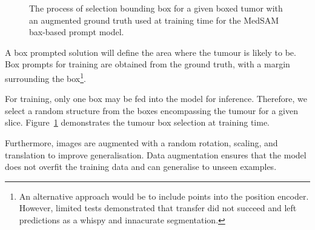 \documentclass[11pt,twoside]{report}
\begin{document}
\begin{figure}
  \centering
  \caption{The process of selection bounding box for a given boxed tumor with an augmented ground truth used at training time for the MedSAM bax-based prompt model.}\label{fig:box-prompt-sam-selection}
\end{figure}

A box prompted solution will define the area where the tumour is likely to be. Box prompts for training are obtained from the ground truth, with a margin surrounding the box\footnote{An alternative approach would be to include points into the position encoder. However, limited tests demonstrated that transfer did not succeed and left predictions as a whispy and innacurate segmentation.}.

For training, only one box may be fed into the model for inference. Therefore, we select a random structure from the boxes encompassing the tumour for a given slice. Figure~\ref{fig:box-prompt-sam-selection} demonstrates the tumour box selection at training time. 

Furthermore, images are augmented with a random rotation, scaling, and translation to improve generalisation. Data augmentation ensures that the model does not overfit the training data and can generalise to unseen examples.

\end{document}
